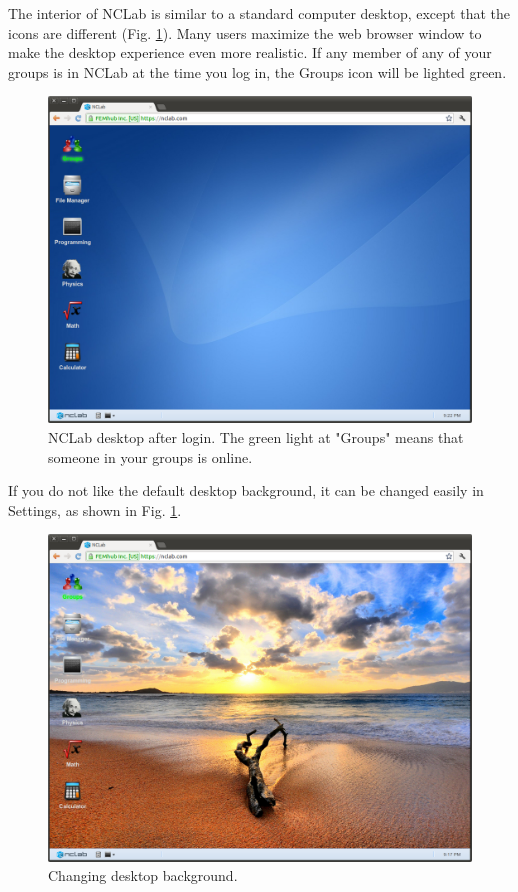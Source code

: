 \documentclass[article,A4,12pt]{llncs}
\begin{document}
The interior of NCLab is similar to a standard computer desktop, except that the 
icons are different (Fig. \ref{fig:desktop}). Many users maximize 
the web browser window to make the desktop experience even more realistic.
If any member of any of your groups is in NCLab at the time you log in, the Groups icon 
will be lighted green.

\newpage

\begin{figure}[!ht]
\begin{center}
\includegraphics[width=\textwidth]{img/desktop.png}
\end{center}
\caption{NCLab desktop after login. The green light at "Groups" means that someone in your 
         groups is online.}
\label{fig:desktop}
\end{figure}
\noindent
If you do not like the default desktop background, it can be changed easily in Settings, as shown in 
Fig. \ref{fig:desktop}.
\newpage
\begin{figure}[!ht]
\begin{center}
\includegraphics[width=\textwidth]{img/desktop2.png}
\end{center}
\caption{Changing desktop background.}
\label{fig:desktop2}
\end{figure}
\noindent
\end{document}
